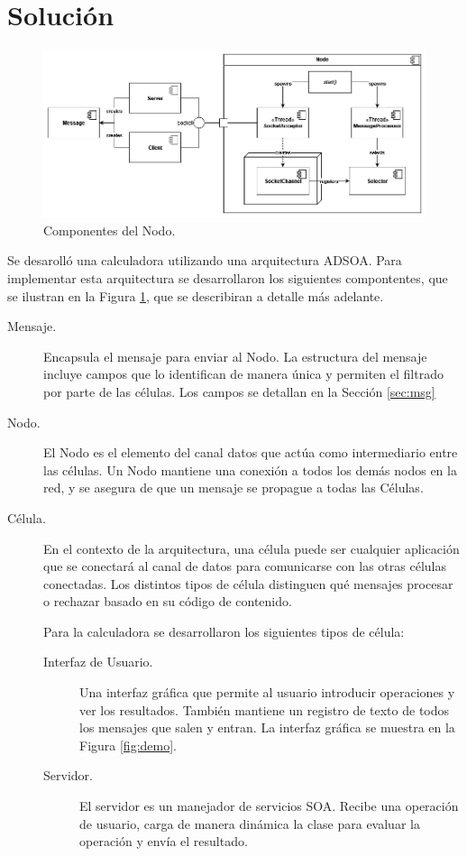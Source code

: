 \documentclass[conference,compsoc]{IEEEtran}
\begin{document}
\section{Solución}

\begin{figure}[hbt]
    \centering
    \includegraphics[width=\columnwidth]{node_components.png}
    \caption{Componentes del Nodo.}
    \label{fig:components}
\end{figure}

Se desarolló una calculadora utilizando una arquitectura ADSOA. Para implementar esta arquitectura se desarrollaron los siguientes compontentes, que se ilustran en la Figura \ref{fig:components}, que se describiran a detalle más adelante.

\begin{description}
    \item[Mensaje.] Encapsula el mensaje para enviar al Nodo. La estructura del mensaje incluye campos que lo identifican de manera única y permiten el filtrado por parte de las células. Los campos se detallan en la Sección \ref{sec:msg}
    \item[Nodo.] El Nodo es el elemento del canal datos que actúa como intermediario entre las células. Un Nodo mantiene una conexión a todos los demás nodos en la red, y se asegura de que un mensaje se propague a todas las Células.
    \item[Célula.] En el contexto de la arquitectura, una célula puede ser cualquier aplicación que se conectará al canal de datos para comunicarse con las otras células conectadas. Los distintos tipos de célula distinguen qué mensajes procesar o rechazar basado en su código de contenido.
    
    Para la calculadora se desarrollaron los siguientes tipos de célula:
    \begin{description}
        \item[Interfaz de Usuario.] Una interfaz gráfica que permite al usuario introducir operaciones y ver los resultados. También mantiene un registro de texto de todos los mensajes que salen y entran. La interfaz gráfica se muestra en la Figura \ref{fig:demo}.
        \item[Servidor.] El servidor es un manejador de servicios SOA. Recibe una operación de usuario, carga de manera dinámica la clase para evaluar la operación y envía el resultado.
    \end{description}
\end{description}
\end{document}

